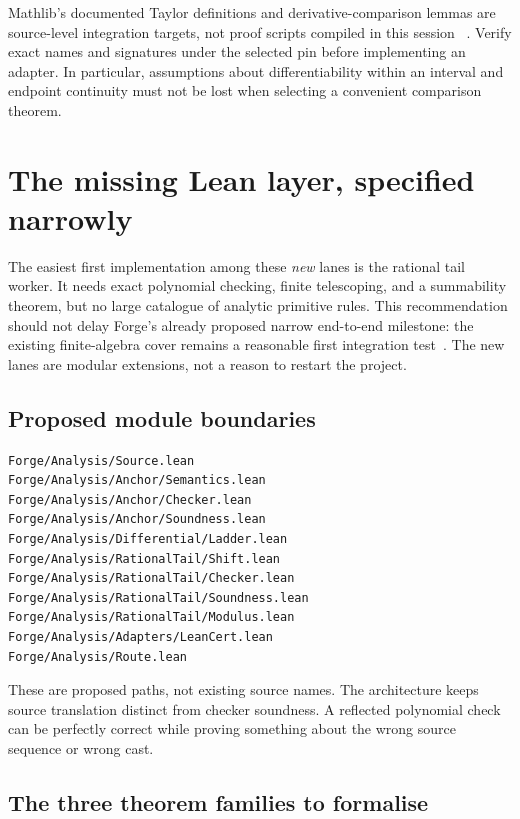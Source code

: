 \documentclass[11pt,a4paper]{article}
\theoremstyle{definition}\newtheorem{definition}[theorem]{Definition}
\begin{document}
Mathlib's documented Taylor definitions and derivative-comparison lemmas are
source-level integration targets, not proof scripts compiled in this session
~\cite{mathlib-taylor,mathlib-meanvalue}. Verify exact names and signatures under
the selected pin before implementing an adapter. In particular, assumptions
about differentiability within an interval and endpoint continuity must not be
lost when selecting a convenient comparison theorem.

\section{The missing Lean layer, specified narrowly}
\label{sec:lean}

The easiest first implementation among these \emph{new} lanes is the rational
tail worker. It needs exact polynomial checking, finite telescoping, and a
summability theorem, but no large catalogue of analytic primitive rules. This
recommendation should not delay Forge's already proposed narrow end-to-end
milestone: the existing finite-algebra cover remains a reasonable first
integration test~\cite{forge-conclusion}. The new lanes are modular extensions,
not a reason to restart the project.

\subsection{Proposed module boundaries}

\begin{lstlisting}
Forge/Analysis/Source.lean
Forge/Analysis/Anchor/Semantics.lean
Forge/Analysis/Anchor/Checker.lean
Forge/Analysis/Anchor/Soundness.lean
Forge/Analysis/Differential/Ladder.lean
Forge/Analysis/RationalTail/Shift.lean
Forge/Analysis/RationalTail/Checker.lean
Forge/Analysis/RationalTail/Soundness.lean
Forge/Analysis/RationalTail/Modulus.lean
Forge/Analysis/Adapters/LeanCert.lean
Forge/Analysis/Route.lean
\end{lstlisting}

These are proposed paths, not existing source names. The architecture keeps
source translation distinct from checker soundness. A reflected polynomial
check can be perfectly correct while proving something about the wrong source
sequence or wrong cast.

\subsection{The three theorem families to formalise}
\end{document}
